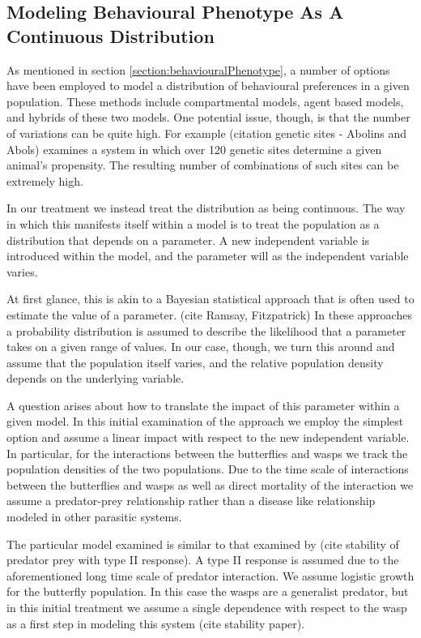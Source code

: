 \documentclass[12pt]{article}
\begin{document}
\subsection{Modeling Behavioural Phenotype As A Continuous
  Distribution}

As mentioned in section \ref{section:behaviouralPhenotype}, a number
of options have been employed to model a distribution of behavioural
preferences in a given population. These methods include compartmental
models, agent based models, and hybrids of these two models. One
potential issue, though, is that the number of variations can be quite
high. For example (citation genetic sites - Abolins and Abols)
examines a system in which over 120 genetic sites determine a given
animal's propensity. The resulting number of combinations of such
sites can be extremely high.

In our treatment we instead treat the distribution as being
continuous. The way in which this manifests itself within a model is
to treat the population as a distribution that depends on a
parameter. A new independent variable is introduced within the model,
and the parameter will as the independent variable varies.

At first glance, this is akin to a Bayesian statistical approach that
is often used to estimate the value of a parameter. (cite Ramsay,
Fitzpatrick) In these approaches a probability distribution is assumed
to describe the likelihood that a parameter takes on a given range of
values. In our case, though, we turn this around and assume that the
population itself varies, and the relative population density depends
on the underlying variable.

A question arises about how to translate the impact of this parameter
within a given model. In this initial examination of the approach we
employ the simplest option and assume a linear impact with respect to
the new independent variable. In particular, for the interactions
between the butterflies and wasps we track the population densities of
the two populations. Due to the time scale of interactions between the
butterflies and wasps as well as direct mortality of the interaction
we assume a predator-prey relationship rather than a disease like
relationship modeled in other parasitic systems.

The particular model examined is similar to that examined by (cite
stability of predator prey with type II response). A type II response
is assumed due to the aforementioned long time scale of predator
interaction. We assume logistic growth for the butterfly
population. In this case the wasps are a generalist predator, but in
this initial treatment we assume a single dependence with respect to
the wasp as a first step in modeling this system (cite stability paper).
\end{document}
